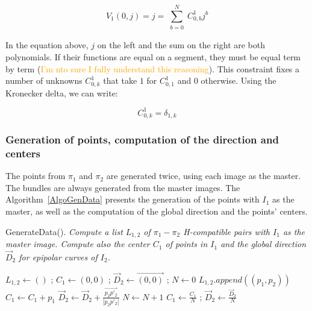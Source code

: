 \documentclass{ipol}
\newcommand{\PiVert}{\widetilde{\pi}}
\newcommand{\er}[1]{\textcolor{orange}{#1}}
\begin{document}
\begin{equation}
    V_1(0,j) =  j =   \sum\limits_{\substack{b=0}}^{N}  C^1_{0,b}  j^b  \label{CstrV1:0}
\end{equation}

In the equation above, $j$ on the left and the  sum on the right are both polynomials. If their functions are equal on a segment, they
must be equal term by term (\er{I'm nto sure I fully understand this reasoning}). This constraint fixes a number of unknowns $C^1_{0,k}$ that take $1$ for $C^1_{0,1}$ and $0$ otherwise.
Using the Kronecker delta, we can write:

\begin{equation}
         C^1_{0,k} = \delta_{1,k} \label{CstrV1:1}
\end{equation}

\subsubsection{Generation of points, computation of the direction and centers}

The  points from $\pi_1$ and $\pi_2$ are generated twice, using each image as the master. The bundles are always generated from the  master images. The Algorithm~\ref{AlgoGenData} presents the 
generation of the points with $I_1$  as the master, as well as the computation of the global direction and the points' centers.

\begin{algorithm}[H]
\caption{GenerateData(). \emph{Compute a list $L_{1,2}$  of   $\pi_1-\pi_2$ H-compatible pairs with $I_1$ as the master image.
 Compute also the center $C_1$ of points in $I_1$  and the global direction $\vec{D}_2$ for epipolar curves of $I_2$.}}
\begin{algorithmic}
    \STATE $L_{1,2}\gets () $ ;  $C_1 \gets (0,0)$  ;   $\vec{D}_2 \gets  \overrightarrow{(0,0)}$ ; $N \gets 0 $
                  \STATE {$p_2 = \pi_2(\PiVert^{-1}_1(p_1,Z))$}
                  \STATE {$p'_2 = \pi_2(\PiVert^{-1}_1(p_1,Z+\delta_{z}))$}
                       \STATE $L_{1,2}.append((p_1,p_2))$  
                       \STATE $C_1 \gets C_1 + p_1$
                       \STATE $\vec{D}_2 \gets  \vec{D}_2 + \frac{\overrightarrow{p_2 p'_2}}{|p_2 p'_2|}$
                       \STATE $N \gets  N +1 $
                  \ENDIF
             \ENDFOR
        \ENDFOR
    \ENDFOR
    $C_1 \gets \frac{C_1}{N}$  ; $\vec{D}_2 \gets \frac{\vec{D}_2}{N} $
\end{algorithmic}
\label{AlgoGenData}
\end{algorithm}
\end{document}

